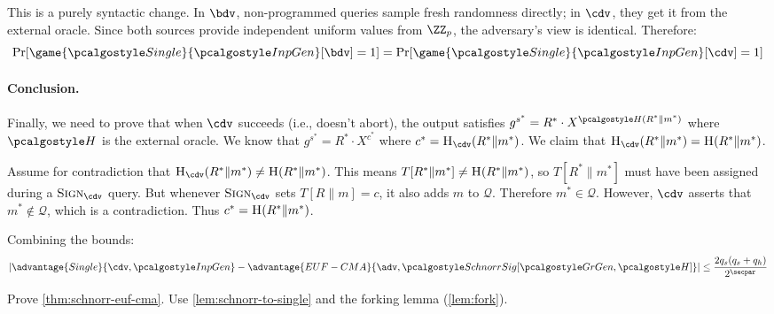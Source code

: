 \begin{mysolution}
  This is a purely syntactic change. In $\bdv$, non-programmed queries sample fresh randomness directly; in $\cdv$, they get it from the external oracle.
  Since both sources provide independent uniform values from $\ZZ_p$, the adversary's view is identical. Therefore:
  \[
    \Pr[\game{\algo{Single}}{\algo{InpGen}}[\bdv] = 1] = \Pr[\game{\algo{Single}}{\algo{InpGen}}[\cdv] = 1]
  \]

  \paragraph{Conclusion.}
  Finally, we need to prove that when $\cdv$ succeeds (i.e., doesn't abort), the output satisfies $g^{s^*} = R^* \cdot X^{\algo{H}(R^* \| m^*)}$ where $\algo{H}$ is the external oracle. We know that $g^{s^*} = R^* \cdot X^{c^*}$ where $c^* = \pcoracle{H}_{\cdv}(R^* \| m^*)$. We claim that $\pcoracle{H}_{\cdv}(R^* \| m^*) = \pcoracle{H}(R^* \| m^*)$.
  
  Assume for contradiction that $\pcoracle{H}_{\cdv}(R^* \| m^*) \neq \pcoracle{H}(R^* \| m^*)$. This means $T[R^* \| m^*] \neq {\normalfont\textsc{H}}(R^* \| m^*)$, so $T[R^* \| m^*]$ must have been assigned during a $\pcoracle{Sign}_{\cdv}$ query. But whenever $\pcoracle{Sign}_{\cdv}$ sets $T[R \| m] = c$, it also adds $m$ to $\mathcal{Q}$. Therefore $m^* \in \mathcal{Q}$. However, $\cdv$ asserts that $m^* \notin \mathcal{Q}$, which is a contradiction. Thus $c^* = {\normalfont\textsc{H}}(R^* \| m^*)$.
  
  Combining the bounds:
  \[
    \left|\advantage{Single}{\cdv, \algo{InpGen}} - \advantage{EUF-CMA}{\adv, \algo{SchnorrSig}[\grgen, \algo{H}]}\right| \leq \frac{2 q_s(q_s + q_h)}{2^\secpar}
  \]

\end{mysolution}
\fi

\begin{exercise}\label{ex:schnorr-euf-cma}
  Prove \autoref{thm:schnorr-euf-cma}. Use \autoref{lem:schnorr-to-single} and the forking lemma (\autoref{lem:fork}).
\end{exercise}

